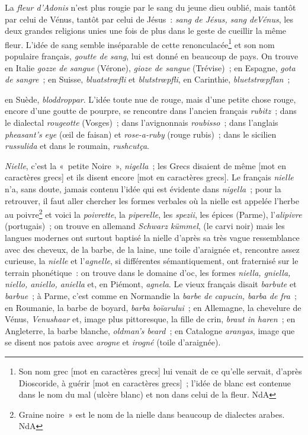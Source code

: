 \documentclass[french,twoside]{book} %
\def\mednobreak{\ifdim\lastskip<\medskipamount
  \removelastskip\nopagebreak\medskip\fi}
\newcommand{\labelblock}[1]{\medbreak{\noindent\color{rubric}\bfseries #1}\par\mednobreak}
\begin{document}
\labelblock{{\itshape Adonis. Nielle.}}

\noindent La {\itshape fleur d’Adonis} n’est plus rougie par le sang du jeune dieu oublié, mais tantôt par celui de Vénus, tantôt par celui de Jésus : {\itshape sang de Jésus, sang deVénus}, les deux grandes religions unies une fois de plus dans le geste de cueillir la même fleur. L’idée de sang semble inséparable de cette renonculacée\footnote{ Son nom grec [mot en caractères grecs] lui venait de ce qu’elle servait, d’après Dioscoride, à guérir [mot en caractères grecs] ; l’idée de blanc est contenue dans le nom du mal (ulcère blanc) et non dans celui de la fleur. NdA} et son nom populaire français, {\itshape goutte de sang}, lui est donné en beaucoup de pays. On trouve en Italie {\itshape gozze de sangue} (Vérone), {\itshape gioze de sangue} (Trévise) ; en Espagne, {\itshape gota de sangre} ; en Suisse, {\itshape bluatstrœfli} et {\itshape blutstrœpfli}, en Carinthie, {\itshape bluetstrœpflan} ;\par
en Suède, {\itshape bloddroppar}. L’idée toute nue de rouge, mais d’une petite chose rouge, encore d’une goutte de pourpre, se rencontre dans l’ancien français {\itshape rubitz} ; dans le dialectal {\itshape rougeotte} (Vosges) ; dans l’avignonnais {\itshape roubisso} ; dans l’anglais {\itshape pheasant’s eye} (œil de faisan) et {\itshape rose-a-ruby} (rouge rubis) ; dans le sicilien {\itshape russulida} et dans le roumain, {\itshape rushcutça}.\par
{\itshape Nielle}, c’est la « petite Noire », {\itshape nigella} ; les Grecs disaient de même [mot en caractères grecs] et ils disent encore [mot en caractères grecs]. Le français {\itshape nielle} n’a, sans doute, jamais contenu l’idée qui est évidente dans {\itshape nigella} ; pour la retrouver, il faut aller chercher les formes verbales où la nielle est appelée l’herbe au poivre\footnote{ Graine noire » est le nom de la nielle dans beaucoup de dialectes arabes. NdA} et voici la {\itshape poivrette}, la {\itshape piperelle}, les {\itshape spezii}, les épices (Parme), l’{\itshape alipivre} (portugais) ; on trouve en allemand {\itshape Schwarz kümmel}, (le carvi noir) mais les langues modernes ont surtout baptisé la nielle d’après sa très vague ressemblance avec des cheveux, de la barbe, de la laine, une toile d’araignée et, rencontre assez curieuse, la {\itshape nielle} et l’{\itshape agnelle}, si différentes sémantiquement, ont fraternisé sur le terrain phonétique : on trouve dans le domaine d’oc, les formes {\itshape niella, gniella, niello, aniello, aniella} et, en Piémont, {\itshape agnela}. Le vieux français disait {\itshape barbute} et {\itshape barbue} ; à Parme, c’est comme en Normandie la {\itshape barbe de capucin, barba de fra} ; en Roumanie, la barbe de boyard, {\itshape barba boïarului} ; en Allemagne, la chevelure de Vénus, {\itshape Venushaar} et, image plus pittoresque, la fille de crin, {\itshape braut in haren} ; en Angleterre, la barbe blanche, {\itshape oldman’s beard} ; en Catalogne {\itshape aranyas}, image que se disent nos patois avec {\itshape arogne} et {\itshape irogné} (toile d’araignée).\par
\end{document}
